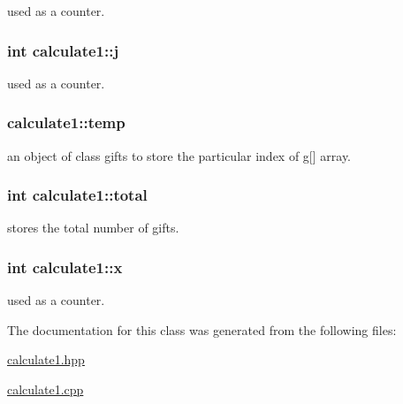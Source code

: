 used as a counter. 

\hypertarget{classcalculate1_a1752f176114621a7780697a522214247}{
\subsubsection[{j}]{\setlength{\rightskip}{0pt plus 5cm}int calculate1\-::j}}\label{classcalculate1_a1752f176114621a7780697a522214247}


used as a counter. 

\hypertarget{classcalculate1_a38238b9c563352dc041e3cc0f171d3e9}{
\subsubsection[{temp}]{ calculate1\-::temp}}\label{classcalculate1_a38238b9c563352dc041e3cc0f171d3e9}


an object of class gifts to store the particular index of g\mbox{[}\mbox{]} array. 

\hypertarget{classcalculate1_a5fe4e73a325db65eea1b6d1579377f53}{
\subsubsection[{total}]{\setlength{\rightskip}{0pt plus 5cm}int calculate1\-::total}}\label{classcalculate1_a5fe4e73a325db65eea1b6d1579377f53}


stores the total number of gifts. 

\hypertarget{classcalculate1_a916258c23d9b3d08d35f3e86f706446b}{
\subsubsection[{x}]{\setlength{\rightskip}{0pt plus 5cm}int calculate1\-::x}}\label{classcalculate1_a916258c23d9b3d08d35f3e86f706446b}


used as a counter. 



The documentation for this class was generated from the following files\-:\begin{DoxyCompactItemize}
\item 
\hyperlink{calculate1_8hpp}{calculate1.\-hpp}\item 
\hyperlink{calculate1_8cpp}{calculate1.\-cpp}\end{DoxyCompactItemize}
